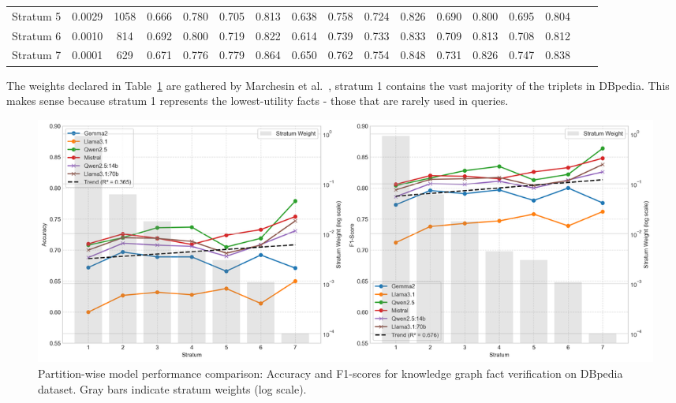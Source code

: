 \begin{table}[ht!]
{\begin{tabular}{lcccccccccccccccc}
            Stratum 5    &  0.0029   & 1058 & 0.666                & 0.780             & 0.705                 & 0.813                 & 0.638                   & 0.758               & 0.724                   & 0.826          & 0.690                      & 0.800               & 0.695                       & 0.804       \\
            Stratum 6    &  0.0010   & 814  & 0.692                & 0.800             & 0.719                 & 0.822                 & 0.614                   & 0.739               & 0.733                   & 0.833          & 0.709                      & 0.813               & 0.708                       & 0.812       \\
            Stratum 7    &  0.0001   & 629  & 0.671                & 0.776             & 0.779                 & 0.864                 & 0.650                   & 0.762               & 0.754                   & 0.848          & 0.731                      & 0.826               & 0.747                       & 0.838       \\
            \bottomrule
        \end{tabular}}
    \label{tab:evaluation_results-partition-wise-dbpedia}
\end{table}

The weights declared in Table~\ref{tab:evaluation_results-partition-wise-dbpedia} are gathered by Marchesin et al.~\cite{Marchesin_Silvello_Alonso_2024}, stratum 1 contains the vast majority of the triplets in DBpedia.
This makes sense because stratum 1 represents the lowest-utility facts - those that are rarely used in queries.

\begin{figure}[ht!]
    \centering
    \begin{minipage}[b]{\textwidth}
        \centering
        \includegraphics[width=\textwidth]{res/F1_ACC_Analysis_Across_Stratum}
    \end{minipage}
    \caption{Partition-wise model performance comparison: Accuracy and F1-scores for knowledge graph fact verification on DBpedia dataset. Gray bars indicate stratum weights (log scale).}
    \label{fig:F1_ACC_Analysis_Across_Stratum}
\end{figure}


